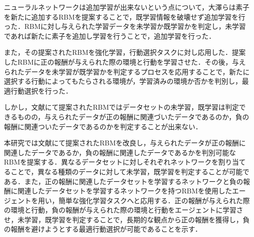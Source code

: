 ニューラルネットワークは追加学習が出来ないという点について，大澤らは素子を新たに追加するRBMを提案することで，既学習情報を破壊せず追加学習を行った\cite{osawa}．RBMに対し与えられた学習データを未学習か既学習かを判定し，未学習であれば新たに素子を追加し学習を行うことで，追加学習を行った．

また，その提案されたRBM\cite{osawa}を強化学習，行動選択タスクに対し応用した．提案したRBMに正の報酬が与えられた際の環境と行動を学習させた．その後，与えられたデータを未学習が既学習かを判定するプロセスを応用することで，新たに選択する行動によってもたらされる環境が，学習済みの環境か否かを判別し，最適行動選択を行った．

しかし，文献\cite{osawa}にて提案されたRBMではデータセットの未学習，既学習は判定できるものの，与えられたデータが正の報酬に関連づいたデータであるのか，負の報酬に関連ついたデータであるのかを判定することが出来ない．

本研究では文献\cite{osawa}にて提案されたRBMを改良し，与えられたデータが正の報酬に関連したデータであるか，負の報酬に関連したデータであるかを判別可能なRBMを提案する．異なるデータセットに対しそれぞれネットワークを割り当てることで，異なる種類のデータに対して未学習，既学習を判定することが可能である．また，正の報酬に関連したデータセットを学習するネットワークと負の報酬に関連したデータセットを学習するネットワークを持つRBMを使用したエージェントを用い，簡単な強化学習タスクへと応用する．正の報酬が与えられた際の環境と行動，負の報酬が与えられた際の環境と行動をエージェントに学習させ，未学習，既学習を判定することで，長期的な観点から正の報酬を獲得し，負の報酬を避けようとする最適行動選択が可能であることを示す．



